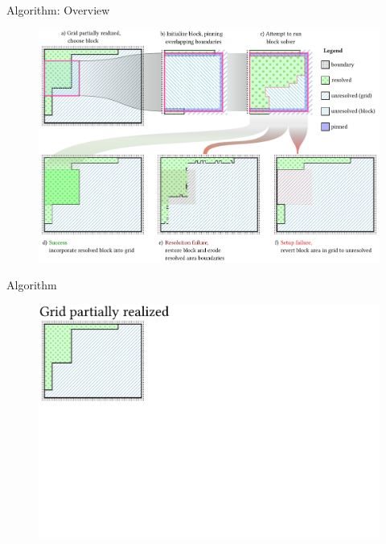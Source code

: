 \documentclass{beamer}
\begin{document}


  \begin{frame}[fragile]{Algorithm: Overview }
    \begin{figure}
      \includegraphics[width=\textwidth]{figs/poms_figalg.pdf}
    \end{figure}
  \end{frame}

  \begin{frame}[fragile]{Algorithm}
    \begin{figure}
      \includegraphics[width=\textwidth]{figs/poms_alg0.pdf}
    \end{figure}
  \end{frame}
\end{document}
